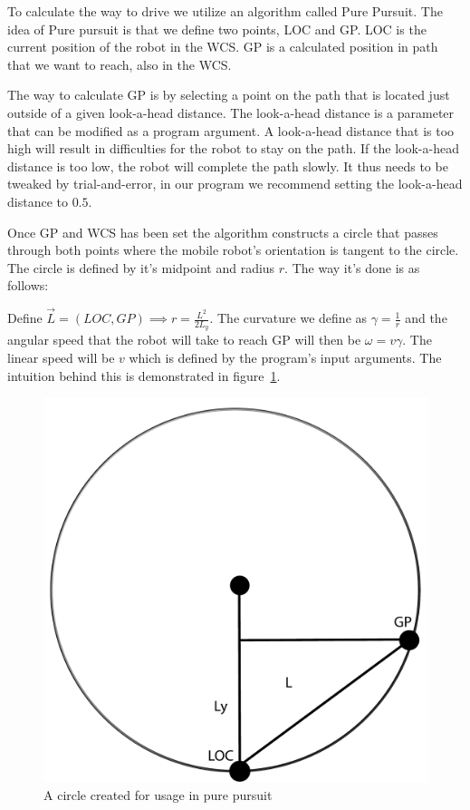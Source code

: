 \documentclass[12pt]{article}
\begin{document}
To calculate the way to drive we utilize an algorithm called Pure Pursuit. The
idea of Pure pursuit is that we define two points, LOC and GP. LOC is the
current position of the robot in the WCS. GP is a calculated position in path
that we want to reach, also in the WCS. 

The way to calculate GP is by selecting a point on the path that is located
just outside of a given look-a-head distance. The look-a-head distance is a
parameter that can be modified as a program argument. A look-a-head
distance that is too high will result in difficulties for the robot to stay on the path.
If the look-a-head distance is too low, the robot will complete the path slowly. It thus needs
to be tweaked by trial-and-error, in our program we recommend setting the look-a-head
distance to $0.5$.

Once GP and WCS has been set the algorithm constructs a circle that passes
through both points where the mobile robot's orientation is tangent to the
circle. The circle is defined by it's midpoint and radius $r$. The way it's done is
as follows:

Define $\vec{L} = (LOC, GP) \implies r = \frac{L^2}{2L_{y}}$. The curvature we
define as $\gamma = \frac{1}{r}$ and the angular speed that the robot will
take to reach GP will then be $\omega = v\gamma$. The linear speed will 
be $v$ which is defined by the program's input arguments. The intuition behind
this is demonstrated in figure~\ref{fig:purepursuit}.

\begin{figure}[!htb]
    \centering
		\includegraphics[scale=0.3]{circle.pdf}
    \caption{A circle created for usage in pure pursuit}
    \label{fig:purepursuit}
\end{figure}
\end{document}
